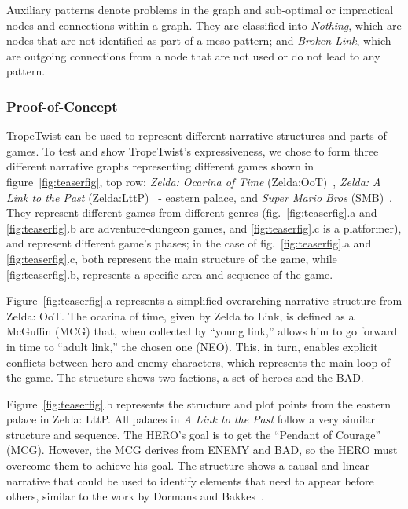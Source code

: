 Auxiliary patterns denote problems in the graph and sub-optimal or impractical nodes and connections within a graph. They are classified into \textit{Nothing}, which are nodes that are not identified as part of a meso-pattern; and \textit{Broken Link}, which are outgoing connections from a node that are not used or do not lead to any pattern.

\subsubsection{Proof-of-Concept}
\label{sec:PoC}

TropeTwist can be used to represent different narrative structures and parts of games. To test and show TropeTwist's expressiveness, we chose to form three different narrative graphs representing different games shown in figure~\ref{fig:teaserfig}, top row: \emph{Zelda: Ocarina of Time} (Zelda:OoT)~\cite{p12tloz:oot}, \emph{Zelda: A Link to the Past} (Zelda:LttP)~\cite{p12tloz:lttp} - eastern palace, and \emph{Super Mario Bros} (SMB)~\cite{p12mario}. They represent different games from different genres (fig.~\ref{fig:teaserfig}.a and \ref{fig:teaserfig}.b are adventure-dungeon games, and \ref{fig:teaserfig}.c is a platformer), and represent different game's phases; in the case of fig.~\ref{fig:teaserfig}.a and \ref{fig:teaserfig}.c, both represent the main structure of the game, while \ref{fig:teaserfig}.b, represents a specific area and sequence of the game.

Figure~\ref{fig:teaserfig}.a represents a simplified overarching narrative structure from Zelda: OoT. The ocarina of time, given by Zelda to Link, is defined as a McGuffin (MCG) that, when collected by ``young link,'' allows him to go forward in time to ``adult link,'' the chosen one (NEO). This, in turn, enables explicit conflicts between hero and enemy characters, which represents the main loop of the game. The structure shows two factions, a set of heroes and the BAD. %


Figure~\ref{fig:teaserfig}.b represents the structure and plot points from the eastern palace in Zelda: LttP. All palaces in \textit{A Link to the Past} follow a very similar structure and sequence. The HERO's goal is to get the ``Pendant of Courage'' (MCG). However, the MCG derives from ENEMY and BAD, so the HERO must overcome them to achieve his goal. The structure shows a causal and linear narrative that could be used to identify elements that need to appear before others, similar to the work by Dormans and Bakkes~\cite{p12dormans2011generating}. %

